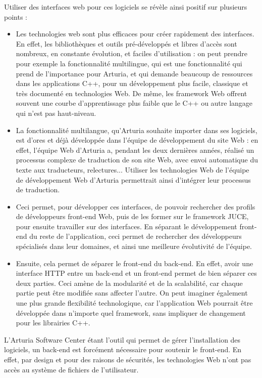 \documentclass[francais]{rapportPFE}  %
\begin{document}
Utiliser des interfaces web pour ces logiciels se révèle ainsi positif sur plusieurs points : 
\begin{itemize}
	\item Les technologies web sont plus efficaces pour créer rapidement des interfaces. En effet, les bibliothèques et outils pré-développés et libres d'accès sont nombreux, en constante évolution, et faciles d'utilisation : on peut prendre pour exemple la fonctionnalité multilingue, qui est une fonctionnalité qui prend de l'importance pour Arturia, et qui demande beaucoup de ressources dans les applications C++, pour un développement plus facile, classique et très documenté en technologies Web. De même, les framework Web offrent souvent une courbe d'apprentissage plus faible que le C++ ou autre langage qui n'est pas haut-niveau.
	\item La fonctionnalité multilangue, qu'Arturia souhaite importer dans ses logiciels, est d'ores et déjà développée dans l'équipe de développement du site Web : en effet, l'équipe Web d'Arturia a, pendant les deux dernières années, réalisé un processus complexe de traduction de son site Web, avec envoi automatique du texte aux traducteurs, relectures... Utiliser les technologies Web de l'équipe de développement Web d'Arturia permettrait ainsi d'intégrer leur processus de traduction.
	\item Ceci permet, pour développer ces interfaces, de pouvoir rechercher des profils de développeurs front-end Web, puis de les former sur le framework JUCE, pour ensuite travailler sur des interfaces. En séparant le développement front-end du reste de l'application, ceci permet de rechercher des développeurs spécialisés dans leur domaines, et ainsi une meilleure évolutivité de l'équipe.
	\item Ensuite, cela permet de séparer le front-end du back-end. En effet, avoir une interface HTTP entre un back-end et un front-end permet de bien séparer ces deux parties. Ceci amène de la modularité et de la scalabilité, car chaque partie peut être modifiée sans affecter l'autre. On peut imaginer également une plus grande flexibilité technologique, car l'application Web pourrait être développée dans n'importe quel framework, sans impliquer de changement pour les librairies C++.
\end{itemize}

L'Arturia Software Center étant l'outil qui permet de gérer l'installation des logiciels, un back-end est forcément nécessaire pour soutenir le front-end. En effet, par design et pour des raisons de sécurités, les technologies Web n'ont pas accès au système de fichiers de l'utilisateur.
\end{document}
